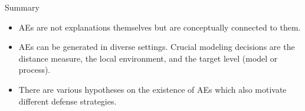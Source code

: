 \documentclass[11pt,compress,t,notes=noshow, aspectratio=169, xcolor=table]{beamer}
\begin{document}

\begin{vbframe}[c]{Summary}
\begin{itemize}
    \item AEs are not explanations themselves but are conceptually connected to them.
    \item AEs can be generated in diverse settings. Crucial modeling decisions are the distance measure, the local environment, and the target level (model or process).
    \item There are various hypotheses on the existence of AEs which also motivate different defense strategies.
\end{itemize}
\end{vbframe}

\end{document}
